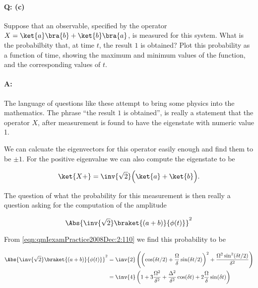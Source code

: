 \paragraph{Q: (c)}

Suppose that an observable, specified by the operator $X = 
\ket{a}\bra{b}
+ \ket{b}\bra{a}$, is measured for this system.  What is the probabilbity that, at time $t$, the result $1$ is obtained?  Plot this probability as a function of time, showing the maximum and minimum values of the function, and the corresponding values of $t$.

\paragraph{A:}

The language of questions like these attempt to bring some physics into the mathematics.  The phrase ``the result $1$ is obtained'', is really a statement that the operator $X$, after measurement is found to have the eigenstate with numeric value 1.

We can calcuate the eigenvectors for this operator easily enough and find them to be $\pm 1$.  For the positive eigenvalue we can also compute the eigenstate to be

\begin{equation}\label{eqn:qmIexamPractice2008Dec:2:120}
\ket{X+} = \inv{\sqrt{2}} \Bigl( \ket{a} + \ket{b} \Bigr).
\end{equation}

The question of what the probability for this measurement is then really a question asking for the computation of the amplitude

\begin{equation}\label{eqn:qmIexamPractice2008Dec:2:130}
\Abs{
\inv{\sqrt{2}}
\braket{
 (a + b)}{\phi(t)}}^2
\end{equation}

From \ref{eqn:qmIexamPractice2008Dec:2:110} we find this probability to be

\begin{align*}
\Abs{
\inv{\sqrt{2}}
\braket{
 (a + b)}{\phi(t)}}^2
&=
\inv{2} \left(
\left(\cos(\delta t/2) + \frac{\Omega}{\delta} \sin(\delta t/2)\right)^2
+ \frac{ \Omega^2 \sin^2(\delta t/2)}{\delta^2}
\right) \\
&=
\inv{4} \left( 1 + 3 \frac{\Omega^2}{\delta^2} + \frac{\Delta^2}{\delta^2} \cos (\delta t) + 2 \frac{ \Omega}{\delta} \sin(\delta t) \right)
\end{align*}


